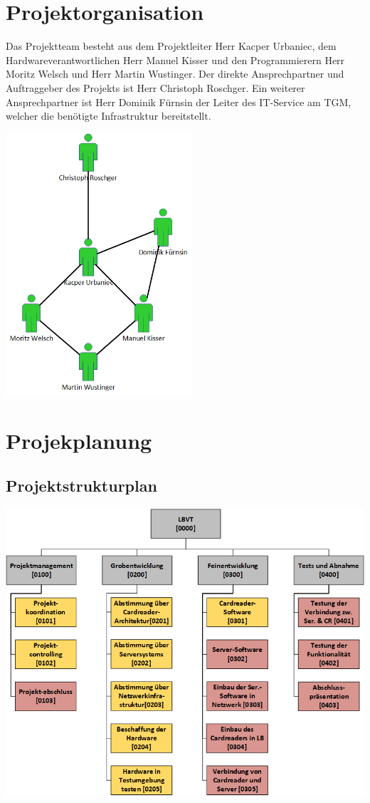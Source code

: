\section{Projektorganisation}
Das Projektteam besteht aus dem Projektleiter Herr Kacper Urbaniec, dem Hardwareverantwortlichen Herr Manuel Kisser und den Programmierern Herr Moritz Welsch und Herr Martin Wustinger. Der direkte Ansprechpartner und Auftraggeber des Projekts ist Herr Christoph Roschger. Ein weiterer Ansprechpartner ist Herr Dominik Fürnsin der Leiter des IT-Service am TGM, welcher die benötigte Infrastruktur bereitstellt.\\
\begin{center}
    \includegraphics[width=6.9cm]{images/Projektorganisation.png}
\end{center}

\section{Projekplanung}
\subsection{Projektstrukturplan}
\includegraphics[width=\textwidth]{images/PSP.png}

